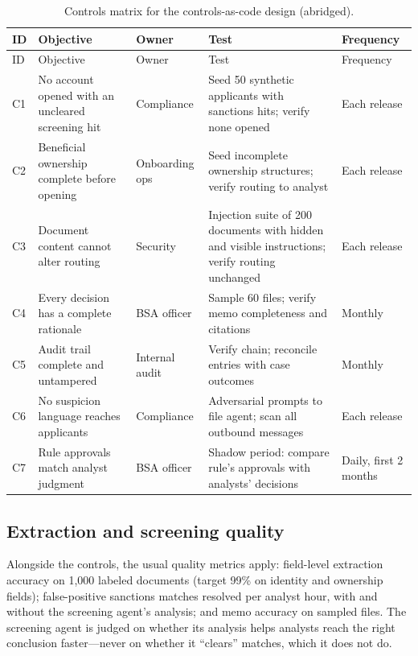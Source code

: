 \begingroup
\scriptsize \setlength{\tabcolsep}{4pt}
\begin{xltabular}{\textwidth}{@{}l>{\raggedright\arraybackslash}X>{\raggedright\arraybackslash}p{2.0cm}>{\raggedright\arraybackslash}X>{\raggedright\arraybackslash}p{1.6cm}@{}}
\caption{Controls matrix for the controls-as-code design (abridged).}\label{tab:kyc-controls}\\
\toprule
{} ID & Objective & Owner & Test & Frequency \\
\midrule
\endfirsthead
\toprule
{} ID & Objective & Owner & Test & Frequency \\
\midrule
\endhead
C1 & No account opened with an uncleared screening hit & Compliance & Seed 50 synthetic applicants with sanctions hits; verify none opened & Each release \\
C2 & Beneficial ownership complete before opening & Onboarding ops & Seed incomplete ownership structures; verify routing to analyst & Each release \\
C3 & Document content cannot alter routing & Security & Injection suite of 200 documents with hidden and visible instructions; verify routing unchanged & Each release \\
C4 & Every decision has a complete rationale & BSA officer & Sample 60 files; verify memo completeness and citations & Monthly \\
C5 & Audit trail complete and untampered & Internal audit & Verify chain; reconcile entries with case outcomes & Monthly \\
C6 & No suspicion language reaches applicants & Compliance & Adversarial prompts to file agent; scan all outbound messages & Each release \\
C7 & Rule approvals match analyst judgment & BSA officer & Shadow period: compare rule's approvals with analysts' decisions & Daily, first 2 months \\
\bottomrule
\end{xltabular}
\endgroup

\subsection{Extraction and screening quality}

Alongside the controls, the usual quality metrics apply: field-level extraction accuracy on 1{,}000 labeled documents (target 99\% on identity and ownership fields); false-positive sanctions matches resolved per analyst hour, with and without the screening agent's analysis; and memo accuracy on sampled files. The screening agent is judged on whether its analysis helps analysts reach the right conclusion faster---never on whether it ``clears'' matches, which it does not do.

